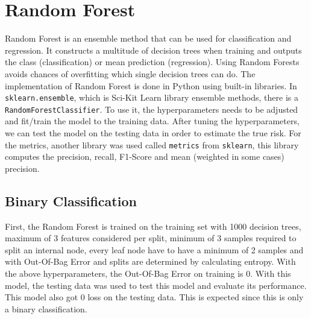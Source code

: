\documentclass[11pt,a4paper,titlepage]{article}
\begin{document}
	\section{Random Forest}
	Random Forest is an ensemble method that can be used for classification and regression. It constructs a multitude of decision trees when training and outputs the class (classification) or mean prediction (regression). Using Random Forests avoids chances of overfitting which single decision trees can do. The implementation of Random Forest is done in Python using built-in libraries. In \texttt{sklearn.ensemble}, which is Sci-Kit Learn library ensemble methods, there is a \texttt{RandomForestClassifier}. To use it, the hyperparameters needs to be adjusted and fit/train the model to the training data. After tuning the hyperparameters, we can test the model on the testing data in order to estimate the true risk. For the metrics, another library was used called \texttt{metrics} from \texttt{sklearn}, this library computes the precision, recall, F1-Score and mean (weighted in some cases) precision. 
	\subsection{Binary Classification}
	First, the Random Forest is trained on the training set with 1000 decision trees, maximum of 3 features considered per split, minimum of 3 samples required to split an internal node, every leaf node have to have a minimum of 2 samples and with Out-Of-Bag Error and splits are determined by calculating entropy. With the above hyperparameters, the Out-Of-Bag Error on training is 0. With this model, the testing data was used to test this model and evaluate its performance. This model also got 0 loss on the testing data. This is expected since this is only a binary classification. 
\end{document}
